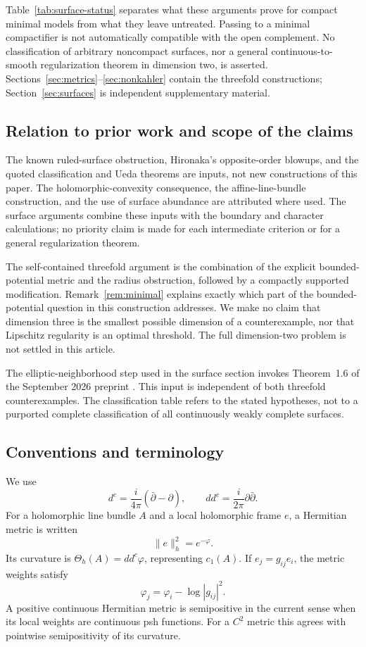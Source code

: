 \documentclass[11pt]{amsart}
\theoremstyle{definition}
\theoremstyle{remark}
\numberwithin{equation}{section}
\newcommand{\ddc}{dd^c}
\newcommand{\barp}{\bar\partial}
\begin{document}
Table~\ref{tab:surface-status} separates what these arguments prove
for compact minimal models from what they leave untreated. Passing
to a minimal compactifier is not automatically compatible with the
open complement. No classification of arbitrary noncompact surfaces,
nor a general continuous-to-smooth regularization theorem in dimension
two, is asserted. Sections~\ref{sec:metrics}--\ref{sec:nonkahler}
contain the threefold constructions; Section~\ref{sec:surfaces} is
independent supplementary material.

\subsection{Relation to prior work and scope of the claims}
\label{subsec:provenance}

The known ruled-surface obstruction, Hironaka's opposite-order blowups,
and the quoted classification and Ueda theorems are inputs, not new
constructions of this paper. The holomorphic-convexity consequence,
the affine-line-bundle construction, and the use of surface abundance
are attributed where used. The surface arguments combine these inputs
with the boundary and character calculations; no priority claim is
made for each intermediate criterion or for a general regularization
theorem.

The self-contained threefold argument is the combination of the
explicit bounded-potential metric and the radius obstruction, followed
by a compactly supported modification. Remark~\ref{rem:minimal}
explains exactly which part of the bounded-potential question in
\cite[Section~4]{Zhang2025} this construction addresses. We make no
claim that dimension three is the smallest possible dimension of a
counterexample, nor that Lipschitz regularity is an optimal threshold.
The full dimension-two problem is not settled in this article.

The elliptic-neighborhood step used in the surface section invokes
Theorem~1.6 of the September 2026 preprint \cite{CFSTZ2026}. This input
is independent of both threefold counterexamples. The classification
table refers to the stated hypotheses, not to a purported complete
classification of all continuously weakly complete surfaces.

\subsection{Conventions and terminology}\label{sec:conventions}

We use
\[
 d^c=\frac{i}{4\pi}(\barp-\partial),\qquad
 \ddc=\frac{i}{2\pi}\partial\barp.
\]
For a holomorphic line bundle $A$ and a local holomorphic frame $e$, a
Hermitian metric is written
\[
 \|e\|_h^2=e^{-\varphi}.
\]
Its curvature is $\Theta_h(A)=\ddc\varphi$, representing $c_1(A)$.
If $e_j=g_{ij}e_i$, the metric weights satisfy
\begin{equation}\label{eq:metric-transition}
 \varphi_j=\varphi_i-\log|g_{ij}|^2.
\end{equation}
A positive continuous Hermitian metric is semipositive in the current
sense when its local weights are continuous psh functions. For a $C^2$
metric this agrees with pointwise semipositivity of its curvature.
\end{document}
